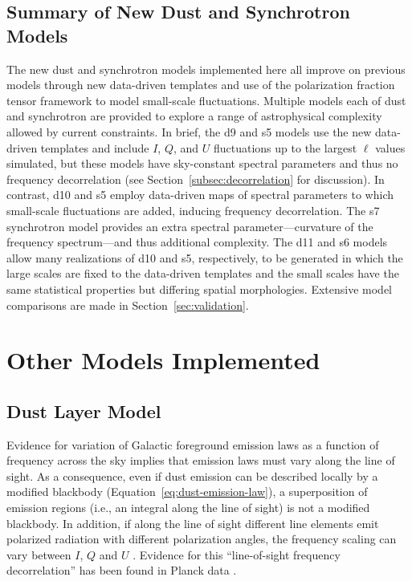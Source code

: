 \documentclass[twocolumn]{aastex631}
\begin{document}
\subsection{Summary of New Dust and Synchrotron Models}

The new dust and synchrotron models implemented here all improve on previous models through new data-driven templates and use of the polarization fraction tensor framework to model small-scale fluctuations. Multiple models each of dust and synchrotron are provided to explore a range of astrophysical complexity allowed by current constraints. In brief, the d9 and s5 models use the new data-driven templates and include $I$, $Q$, and $U$ fluctuations up to the largest $\ell$ values simulated, but these models have sky-constant spectral parameters and thus no frequency decorrelation (see Section~\ref{subsec:decorrelation} for discussion). In contrast, d10 and s5 employ data-driven maps of spectral parameters to which small-scale fluctuations are added, inducing frequency decorrelation. The s7 synchrotron model provides an extra spectral parameter---curvature of the frequency spectrum---and thus additional complexity. The d11 and s6 models allow many realizations of d10 and s5, respectively, to be generated in which the large scales are fixed to the data-driven templates and the small scales have the same statistical properties but differing spatial morphologies. Extensive model comparisons are made in Section~\ref{sec:validation}.

\section{Other Models Implemented} \label{sec:other_models}

\subsection{Dust Layer Model} \label{sec:layers}
Evidence for variation of Galactic foreground emission laws as a function of frequency across the sky implies that emission laws must vary along the line of sight. As a consequence, even if dust emission can be described locally by a modified blackbody (Equation~\ref{eq:dust-emission-law}), a superposition of emission regions (i.e., an integral along the line of sight) is not a modified blackbody. In addition, if along the line of sight different line elements emit polarized radiation with different polarization angles, the frequency scaling can vary between $I$, $Q$ and $U$ \citep{Tassis:2015}. Evidence for this ``line-of-sight frequency decorrelation'' has been found in Planck data \citep{Pelgrims:2021}.
\end{document}
